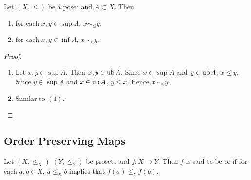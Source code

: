 \documentclass{book}
\begin{document}
	\begin{ex} 
		Let $(X, \leq)$ be a poset and $A \subset X$. Then
		\begin{enumerate}
			\item for each $x, y \in \sup A$, $x \sim_{\leq} y$.
			\item for each $x,y \in \inf A$, $x \sim_{\leq} y$.
		\end{enumerate}   
	\end{ex}
	
	\begin{proof}\
		\begin{enumerate}
			\item Let $x, y \in \sup A$. Then $x,y \in \operatorname{ub} A$. Since $x \in \sup A$ and $y \in \operatorname{ub} A$, $x \leq y$. Since $y \in \sup A$ and $x \in \operatorname{ub} A$, $y \leq x$. Hence $x \sim_{\leq} y$. 
			\item Similar to $(1)$.
		\end{enumerate}
	\end{proof}
	
	
	
	
	
	
	
	
	
	
	
	
	
	
	
	
	
	
	
	
	
	
	
	
	
	
	
	
	
	
	
	
	
	
	
	
	
	
	
	
	
	
	
	
	
	
	
	
	\subsection{Order Preserving Maps}
	
	\begin{defn} 
		Let $(X, \leq_X)$ $(Y, \leq_Y)$ be prosets and $f:X \rightarrow Y$. Then $f$ is said to be  or  if for each $a,b \in X$, $a \leq_X b$ implies that $f(a) \leq_Y f(b)$. 
	\end{defn}
	
\end{document}
